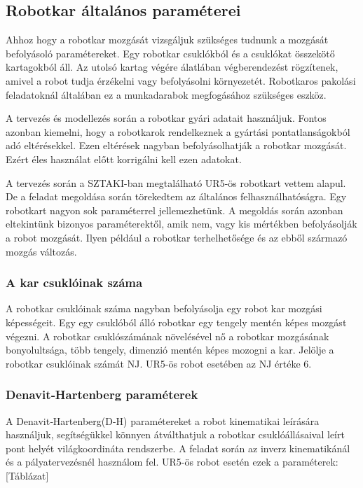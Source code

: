 \subsection{Robotkar általános paraméterei}
Ahhoz hogy a robotkar mozgását vizsgáljuk szükséges tudnunk a mozgását befolyásoló paramétereket. Egy robotkar csuklókból és a csuklókat összekötő kartagokból áll. Az utolsó kartag végére álatlában végberendezést rögzítenek, amivel a robot tudja érzékelni vagy befolyásolni környezetét. Robotkaros pakolási feladatoknál általában ez a munkadarabok megfogásához szükséges eszköz.  

A tervezés és modellezés során a robotkar gyári adatait használjuk. Fontos azonban kiemelni, hogy a robotkarok rendelkeznek a gyártási pontatlanságokból adó eltérésekkel. Ezen eltérések nagyban befolyásolhatják a robotkar mozgását. Ezért éles használat előtt korrigálni kell ezen adatokat.

A tervezés során a SZTAKI-ban megtalálható UR5-ös robotkart vettem alapul. De a feladat megoldása során törekedtem az általános felhasználhatóságra. Egy robotkart nagyon sok paraméterrel jellemezhetünk. A megoldás során azonban eltekintünk bizonyos paraméterektől, amik nem, vagy kis mértékben befolyásolják a robot mozgását. Ilyen például a robotkar terhelhetősége és az ebből származó mozgás változás.
\subsubsection{A kar csuklóinak száma}

A robotkar csuklóinak száma nagyban befolyásolja egy robot kar mozgási képességeit. Egy egy csuklóból álló robotkar egy tengely mentén képes mozgást végezni. A robotkar csuklószámának növelésével nő a robotkar mozgásának bonyolultsága, több tengely, dimenzió mentén képes mozogni a kar. Jelölje a robotkar csuklóinak számát NJ. UR5-ös robot esetében az NJ értéke 6.

\subsubsection{Denavit‑Hartenberg paraméterek}

A Denavit‑Hartenberg(D-H) paramétereket a robot kinematikai leírására használjuk, segítségükkel könnyen átválthatjuk a robotkar csuklóállásaival leírt pont helyét világkoordináta rendszerbe. A feladat során az inverz kinematikánál és a pályatervezésnél használom fel.
UR5-ös robot esetén ezek a paraméterek:
[Táblázat]


